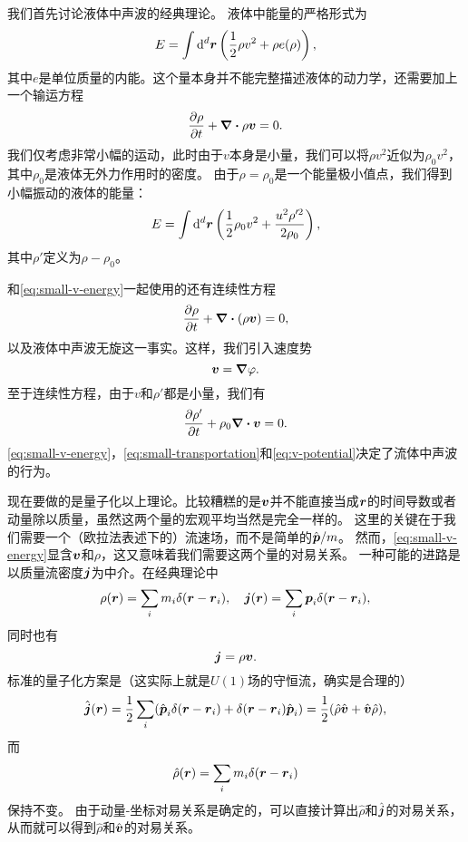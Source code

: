 \documentclass[hyperref, UTF8, a4paper]{ctexart}
\begin{document}
我们首先讨论液体中声波的经典理论。
液体中能量的严格形式为
\begin{equation}
    E = \int \dd[d]{\vb*{r}} \left( \frac{1}{2} \rho v^2 + \rho e(\rho) \right),
\end{equation}
其中$e$是单位质量的内能。这个量本身并不能完整描述液体的动力学，还需要加上一个输运方程
\begin{equation}
    \pdv{\rho}{t} + \div{\rho \vb*{v}} = 0.
\end{equation}
我们仅考虑非常小幅的运动，此时由于$v$本身是小量，我们可以将$\rho v^2$近似为$\rho_0 v^2$，其中$\rho_0$是液体无外力作用时的密度。
由于$\rho=\rho_0$是一个能量极小值点，我们得到小幅振动的液体的能量：
\begin{equation}
    E = \int \dd[d]{\vb*{r}} \left( \frac{1}{2} \rho_0 v^2 + \frac{u^2 \rho'^2}{2 \rho_0} \right),
    \label{eq:small-v-energy}
\end{equation}
其中$\rho'$定义为$\rho-\rho_0$。

和\eqref{eq:small-v-energy}一起使用的还有连续性方程
\[
    \pdv{\rho}{t} + \div{(\rho \vb*{v})} = 0,
\]
以及液体中声波无旋这一事实。这样，我们引入速度势
\begin{equation}
    \vb*{v} = \grad{\varphi}.
    \label{eq:v-potential}
\end{equation}
至于连续性方程，由于$v$和$\rho'$都是小量，我们有
\begin{equation}
    \pdv{\rho'}{t} + \rho_0 \div{\vb*{v}} = 0.
    \label{eq:small-transportation}
\end{equation}
\eqref{eq:small-v-energy}，\eqref{eq:small-transportation}和\eqref{eq:v-potential}决定了流体中声波的行为。

现在要做的是量子化以上理论。比较糟糕的是$\vb*{v}$并不能直接当成$\vb*{r}$的时间导数或者动量除以质量，虽然这两个量的宏观平均当然是完全一样的。
这里的关键在于我们需要一个（欧拉法表述下的）流速场，而不是简单的$\hat{\vb*{p}} / m$。
然而，\eqref{eq:small-v-energy}显含$\vb*{v}$和$\rho$，这又意味着我们需要这两个量的对易关系。
一种可能的进路是以质量流密度$\vb*{j}$为中介。在经典理论中
\[
    \rho(\vb*{r}) = \sum_i m_i \delta(\vb*{r} - \vb*{r}_i), \quad \vb*{j}(\vb*{r}) = \sum_i \vb*{p}_i \delta(\vb*{r} - \vb*{r}_i),
\]
同时也有
\[
    \vb*{j} = \rho \vb*{v}.
\]
标准的量子化方案是（这实际上就是$U(1)$场的守恒流，确实是合理的）
\[
    \hat{\vb*{j}}(\vb*{r}) = \frac{1}{2} \sum_i ( \hat{\vb*{p}}_i \delta(\vb*{r} - \vb*{r}_i) + \delta(\vb*{r} - \vb*{r}_i) \hat{\vb*{p}}_i ) = \frac{1}{2} (\hat{\rho} \hat{\vb*{v}} + \hat{\vb*{v}} \hat{\rho}),
\]
而
\[
    \hat{\rho}(\vb*{r}) = \sum_i m_i \delta(\vb*{r} - \vb*{r}_i)
\]
保持不变。
由于动量-坐标对易关系是确定的，可以直接计算出$\hat{\rho}$和$\hat{\vb*{j}}$的对易关系，从而就可以得到$\hat{\rho}$和$\hat{\vb*{v}}$的对易关系。
\end{document}
